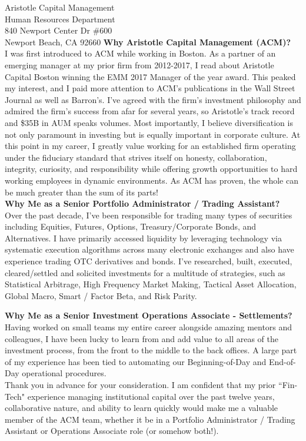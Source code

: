 \documentclass[10pt]{letter}
\begin{document}
\begin{letter}{
  Aristotle Capital Management \\
  Human Resources Department \\
  840 Newport Center Dr \#600 \\
  Newport Beach, CA 92660
}
\textbf{Why Aristotle Capital Management (ACM)?} \\
I was first introduced to ACM while working in Boston.
As a partner of an emerging manager at my prior firm from 2012-2017, I read 
about Aristotle Capital Boston winning the EMM 2017 Manager of the year award.
This peaked my interest, and I paid more attention to ACM's publications in the Wall Street
Journal as well as Barron's. I've agreed with the firm's investment philosophy and
admired the firm's success from afar for several years, so Aristotle's track record
and \$35B in AUM speaks volumes. Most importantly, I believe diversification is not only paramount in investing but is equally important
in corporate culture. At this point in my career, I greatly value working for an established
firm operating under the fiduciary standard that strives itself on honesty, collaboration, integrity,
curiosity, and responsibility while offering growth opportunities to hard working
employees in dynamic environments. As ACM has proven, the whole can be much greater
than the sum of its parts! \\ 

\textbf{Why Me as a Senior Portfolio Administrator / Trading Assistant?} \\
Over the past decade, I've been responsible for trading many types of securities including
Equities, Futures, Options, Treasury/Corporate Bonds, and Alternatives.
I have primarily accessed liquidity by leveraging technology via
systematic execution algorithms across many electronic exchanges and also have experience
trading OTC derivatives and bonds. I've researched, built, executed, cleared/settled
and solicited investments for a multitude of strategies, such as Statistical Arbitrage,
High Frequency Market Making, Tactical Asset Allocation, Global Macro, Smart / Factor Beta,
and Risk Parity.

\newpage

\textbf{Why Me as a Senior Investment Operations Associate - Settlements?} \\
Having worked on small teams my entire career alongside amazing mentors and colleagues,
I have been lucky to learn from and add value to all areas of the investment process,
from the front to the middle to the back offices. A large part of my experience
has been tied to automating our Beginning-of-Day and End-of-Day operational procedures. \\

Thank you in advance for your consideration. I am confident that my prior ``Fin-Tech"
experience managing institutional capital over the past twelve years, collaborative nature,
and ability to learn quickly would make me a valuable member of the ACM team,
whether it be in a Portfolio Administrator / Trading Assistant or Operations
Associate role (or somehow both!). \\


\end{letter}
\end{document}
